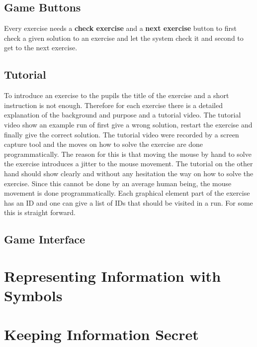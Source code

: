 \subsection*{Game Buttons}
Every exercise needs a \textbf{check exercise} and a \textbf{next exercise} button to first check a given solution to an exercise and let the system check it and second to get to the next exercise.

\subsection*{Tutorial}
To introduce an exercise to the pupils the title of the exercise and a short instruction is not enough. Therefore for each exercise there is a detailed explanation of the background and purpose and a tutorial video. The tutorial video show an example run of first give a wrong solution, restart the exercise and finally give the correct solution.
The tutorial video were recorded by a screen capture tool and the moves on how to solve the exercise are done programmatically. The reason for this is that moving the mouse by hand to solve the exercise introduces a jitter to the mouse movement. The tutorial on the other hand should show clearly and without any hesitation the way on how to solve the exercise. Since this cannot be done by an average human being, the mouse movement is done programmatically. Each graphical element part of the exercise has an ID and one can give a list of IDs that should be visited in a run. For some this is straight forward.

\subsection{Game Interface}


\section{Representing Information with Symbols}


\section{Keeping Information Secret}

